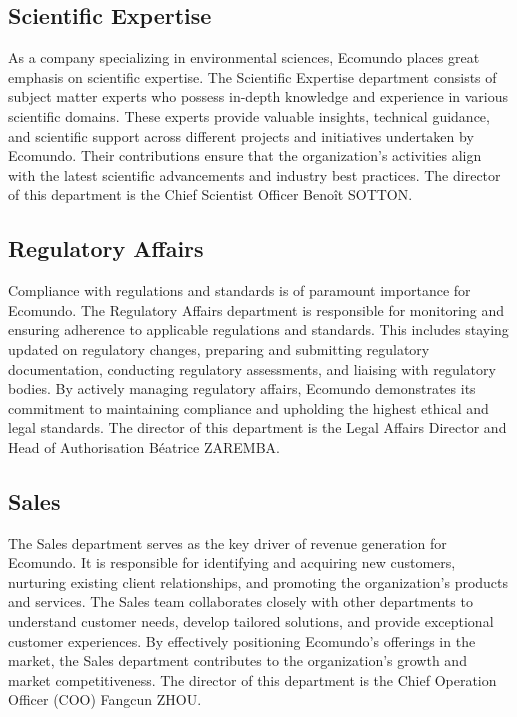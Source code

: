 \documentclass[a4paper,12pt,twoside]{report}
\begin{document}
\subsection{Scientific Expertise}

As a company specializing in environmental sciences, Ecomundo places great emphasis on scientific expertise. The Scientific Expertise department consists of subject matter experts who possess in-depth knowledge and experience in various scientific domains. These experts provide valuable insights, technical guidance, and scientific support across different projects and initiatives undertaken by Ecomundo. Their contributions ensure that the organization's activities align with the latest scientific advancements and industry best practices. The director of this department is the Chief Scientist Officer Benoît SOTTON.

\subsection{Regulatory Affairs}

Compliance with regulations and standards is of paramount importance for Ecomundo. The Regulatory Affairs department is responsible for monitoring and ensuring adherence to applicable regulations and standards. This includes staying updated on regulatory changes, preparing and submitting regulatory documentation, conducting regulatory assessments, and liaising with regulatory bodies. By actively managing regulatory affairs, Ecomundo demonstrates its commitment to maintaining compliance and upholding the highest ethical and legal standards. The director of this department is the Legal Affairs Director and Head of Authorisation Béatrice ZAREMBA.

\subsection{Sales}

The Sales department serves as the key driver of revenue generation for Ecomundo. It is responsible for identifying and acquiring new customers, nurturing existing client relationships, and promoting the organization's products and services. The Sales team collaborates closely with other departments to understand customer needs, develop tailored solutions, and provide exceptional customer experiences. By effectively positioning Ecomundo's offerings in the market, the Sales department contributes to the organization's growth and market competitiveness. The director of this department is the Chief Operation Officer (COO) Fangcun ZHOU.
\end{document}
